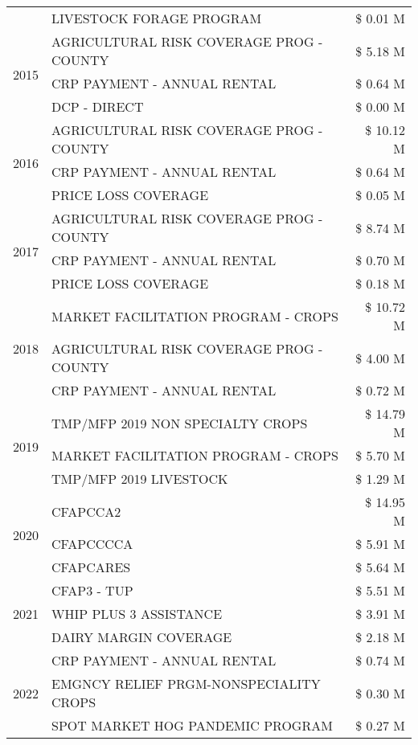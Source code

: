 \begin{tabular}{llr}
 & LIVESTOCK FORAGE PROGRAM & \$ 0.01 M \\
\cline{1-3}
\multirow[t]{3}{*}{2015} & AGRICULTURAL RISK COVERAGE PROG - COUNTY & \$ 5.18 M \\
 & CRP PAYMENT - ANNUAL RENTAL & \$ 0.64 M \\
 & DCP - DIRECT & \$ 0.00 M \\
\cline{1-3}
\multirow[t]{3}{*}{2016} & AGRICULTURAL RISK COVERAGE PROG - COUNTY & \$ 10.12 M \\
 & CRP PAYMENT - ANNUAL RENTAL & \$ 0.64 M \\
 & PRICE LOSS COVERAGE & \$ 0.05 M \\
\cline{1-3}
\multirow[t]{3}{*}{2017} & AGRICULTURAL RISK COVERAGE PROG - COUNTY & \$ 8.74 M \\
 & CRP PAYMENT - ANNUAL RENTAL & \$ 0.70 M \\
 & PRICE LOSS COVERAGE & \$ 0.18 M \\
\cline{1-3}
\multirow[t]{3}{*}{2018} & MARKET FACILITATION PROGRAM - CROPS & \$ 10.72 M \\
 & AGRICULTURAL RISK COVERAGE PROG - COUNTY & \$ 4.00 M \\
 & CRP PAYMENT - ANNUAL RENTAL & \$ 0.72 M \\
\cline{1-3}
\multirow[t]{3}{*}{2019} & TMP/MFP 2019 NON SPECIALTY CROPS & \$ 14.79 M \\
 & MARKET FACILITATION PROGRAM - CROPS & \$ 5.70 M \\
 & TMP/MFP 2019 LIVESTOCK & \$ 1.29 M \\
\cline{1-3}
\multirow[t]{3}{*}{2020} & CFAPCCA2 & \$ 14.95 M \\
 & CFAPCCCCA & \$ 5.91 M \\
 & CFAPCARES & \$ 5.64 M \\
\cline{1-3}
\multirow[t]{3}{*}{2021} & CFAP3 - TUP & \$ 5.51 M \\
 & WHIP PLUS 3 ASSISTANCE & \$ 3.91 M \\
 & DAIRY MARGIN COVERAGE & \$ 2.18 M \\
\cline{1-3}
\multirow[t]{3}{*}{2022} & CRP PAYMENT - ANNUAL RENTAL & \$ 0.74 M \\
 & EMGNCY RELIEF PRGM-NONSPECIALITY CROPS & \$ 0.30 M \\
 & SPOT MARKET HOG PANDEMIC PROGRAM & \$ 0.27 M \\
\cline{1-3}
\bottomrule
\end{tabular}
